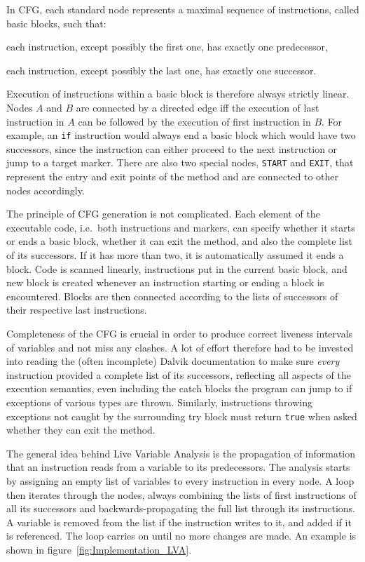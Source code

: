 \documentclass[12pt,twoside,notitlepage]{report}
\begin{document}
In CFG, each standard node represents a maximal sequence of instructions, called basic blocks, such that:
\begin{inparaenum}[(i)]
\item each instruction, except possibly the first one, has exactly one predecessor,
\item each instruction, except possibly the last one, has exactly one successor.
\end{inparaenum}
Execution of instructions within a basic block is therefore always strictly linear. Nodes $A$ and $B$ are connected by a directed edge iff the execution of last instruction in $A$ can be followed by the execution of first instruction in $B$. For example, an \verb$if$ instruction would always end a basic block which would have two successors, since the instruction can either proceed to the next instruction or jump to a target marker. There are also two special nodes, \verb$START$ and \verb$EXIT$, that represent the entry and exit points of the method and are connected to other nodes accordingly.

The principle of CFG generation is not complicated. Each element of the executable code, i.e.\ both instructions and markers, can specify whether it starts or ends a basic block, whether it can exit the method, and also the complete list of its successors. If it has more than two, it is automatically assumed it ends a block. Code is scanned linearly, instructions put in the current basic block, and new block is created whenever an instruction starting or ending a block is encountered. Blocks are then connected according to the lists of successors of their respective last instructions.

Completeness of the CFG is crucial in order to produce correct liveness intervals of variables and not miss any clashes. A lot of effort therefore had to be invested into reading the (often incomplete) Dalvik documentation to make sure \emph{every} instruction provided a complete list of its successors, reflecting all aspects of the execution semantics, even including the catch blocks the program can jump to if exceptions of various types are thrown. Similarly, instructions throwing exceptions not caught by the surrounding try block must return \verb$true$ when asked whether they can exit the method.

The general idea behind Live Variable Analysis is the propagation of information that an instruction reads from a variable to its predecessors. The analysis starts by assigning an empty list of variables to every instruction in every node. A loop then iterates through the nodes, always combining the lists of first instructions of all its successors and backwards-propagating the full list through its instructions. A variable is removed from the list if the instruction writes to it, and added if it is referenced. The loop carries on until no more changes are made. An example is shown in figure~\ref{fig:Implementation_LVA}.
\end{document}
